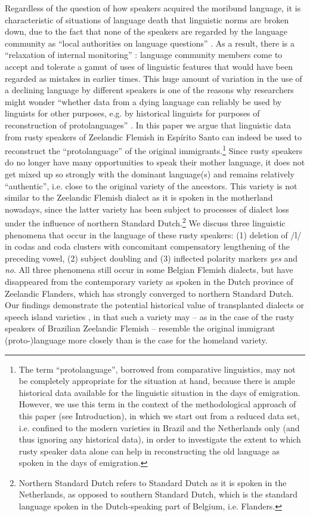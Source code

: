 \documentclass[output=paper,hidelinks,draftmode]{langscibook}
\begin{document}
Regardless of the question of how speakers acquired the moribund language, it is characteristic of situations of language death that linguistic norms are broken down, due to the fact that none of the speakers are regarded by the language community as “local authorities on language questions” \citep[39]{Rottet1995}. As a result, there is a “relaxation of internal monitoring” \citep[154]{Dorian1981}: language community members come to accept and tolerate a gamut of uses of linguistic features that would have been regarded as mistakes in earlier times. This huge amount of variation in the use of a declining language by different speakers is one of the reasons why researchers might wonder “whether data from a dying language can reliably be used by linguists for other purposes, e.g. by historical linguists for purposes of reconstruction of protolanguages” \citep[3]{Rottet1995}. In this paper we argue that linguistic data from rusty speakers of Zeelandic Flemish in Espírito Santo can indeed be used to reconstruct the ``protolanguage'' of the original immigrants.\footnote{The term ``protolanguage'', borrowed from comparative linguistics, may not be completely appropriate for the situation at hand, because there is ample historical data available for the linguistic situation in the days of emigration. However, we use this term in the context of the methodological approach of this paper (see Introduction), in which we start out from a reduced data set, i.e. confined to the modern varieties in Brazil and the Netherlands only (and thus ignoring any historical data), in order to investigate the extent to which rusty speaker data alone can help in reconstructing the old language as spoken in the days of emigration.} Since rusty speakers do no longer have many opportunities to speak their mother language, it does not get mixed up so strongly with the dominant language(s) and remains relatively ``authentic'', i.e. close to the original variety of the ancestors. This variety is not similar to the Zeelandic Flemish dialect as it is spoken in the motherland nowadays, since the latter variety has been subject to processes of dialect loss under the influence of northern Standard Dutch.\footnote{Northern Standard Dutch refers to Standard Dutch as it is spoken in the Netherlands, as opposed to southern Standard Dutch, which is the standard language spoken in the Dutch-speaking part of Belgium, i.e. Flanders.} We discuss three linguistic phenomena that occur in the language of these rusty speakers: (1) deletion of /l/ in codas and coda clusters with concomitant compensatory lengthening of the preceding vowel, (2) subject doubling and (3) inflected polarity markers \textit{yes} and \textit{no}. All three phenomena still occur in some Belgian Flemish dialects, but have disappeared from the contemporary variety as spoken in the Dutch province of Zeelandic Flanders, which has strongly converged to northern Standard Dutch. Our findings demonstrate the potential historical value of transplanted dialects or speech island varieties \citep{Rosenberg2005}, in that such a variety may – as in the case of the rusty speakers of Brazilian Zeelandic Flemish – resemble the original immigrant (proto-)language more closely than is the case for the homeland variety.
\end{document}
